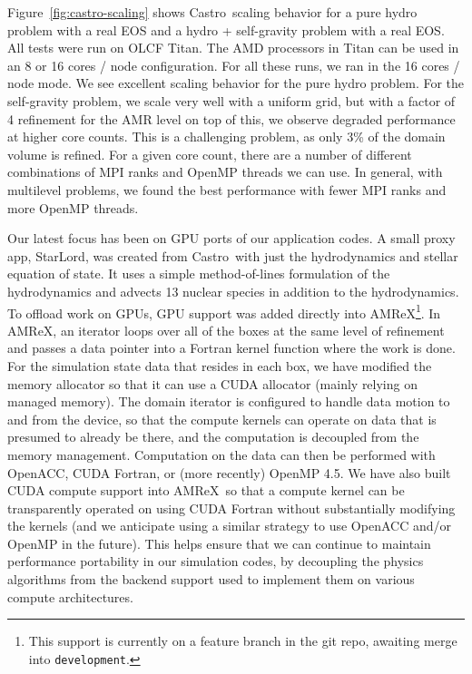 \documentclass[a4paper]{jpconf}
\newcommand{\castro}{{\sffamily Castro}}
\newcommand{\starlord}{{\sffamily StarLord}}
\newcommand{\amrex}{{\sffamily AMReX}}
\begin{document}
Figure~\ref{fig:castro-scaling} shows \castro\ scaling behavior for a
pure hydro problem with a real EOS and a hydro + self-gravity problem
with a real EOS.  All tests were run on OLCF Titan.  The AMD
processors in Titan can be used in an 8 or 16 cores / node
configuration.  For all these runs, we ran in the 16 cores / node
mode.  We see excellent
scaling behavior for the pure hydro problem.  For the self-gravity
problem, we scale very well with a uniform grid, but with a factor of 4
refinement for the AMR level on top of this, we observe degraded
performance at higher core counts.  This is a challenging problem, as
only 3\% of the domain volume is refined.  For a given core count,
there are a number of different combinations of MPI ranks and OpenMP
threads we can use.  In general, with multilevel problems, we found
the best performance with fewer MPI ranks and more OpenMP threads.

Our latest focus has been on GPU ports of our application codes.  A
small proxy app, \starlord, was created from \castro\ with just the
hydrodynamics and stellar equation of state.  It uses a simple
method-of-lines formulation of the hydrodynamics and advects 13
nuclear species in addition to the hydrodynamics.  To offload work on
GPUs, GPU support was added directly into \amrex\footnote{This support
  is currently on a feature branch in the git repo, awaiting merge
  into {\tt development}.}.  In \amrex, an iterator loops over all of
the boxes at the same level of refinement and passes a data pointer
into a Fortran kernel function where the work is done. For the
simulation state data that resides in each box, we have modified the
memory allocator so that it can use a CUDA allocator (mainly relying on
managed memory).  The domain iterator is configured to handle data
motion to and from the device, so that the compute kernels can operate
on data that is presumed to already be there, and the computation is
decoupled from the memory management. Computation on the data can then
be performed with OpenACC, CUDA Fortran, or (more recently) OpenMP
4.5. We have also built CUDA compute support into \amrex\ so that a
compute kernel can be transparently operated on using CUDA Fortran
without substantially modifying the kernels (and we anticipate using a
similar strategy to use OpenACC and/or OpenMP in the future). This
helps ensure that we can continue to maintain performance portability
in our simulation codes, by decoupling the physics algorithms from the
backend support used to implement them on various compute
architectures.
\end{document}
